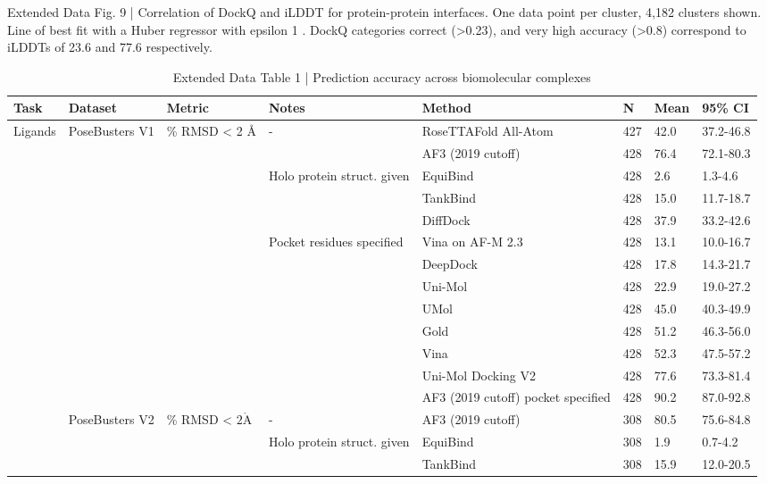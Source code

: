 \documentclass[10pt]{article}
\def\AA{\mathring{\mathrm{A}}}
\begin{document}
Extended Data Fig. 9 | Correlation of DockQ and iLDDT for protein-protein interfaces. One data point per cluster, 4,182 clusters shown. Line of best fit with a Huber regressor with epsilon 1 . DockQ categories correct (>0.23), and very high accuracy (>0.8) correspond to iLDDTs of 23.6 and 77.6 respectively.

\begin{table}[h]
\begin{center}
\captionsetup{labelformat=empty}
\caption{Extended Data Table 1 | Prediction accuracy across biomolecular complexes}
\begin{tabular}{|l|l|l|l|l|l|l|l|}
\hline
Task & Dataset & Metric & Notes & Method & N & Mean & 95\% CI \\
\hline
\multirow[t]{23}{*}{Ligands} & \multirow[t]{13}{*}{PoseBusters V1} & \multirow[t]{13}{*}{\% RMSD < 2 Å} & \multirow[t]{2}{*}{-} & RoseTTAFold All-Atom & 427 & 42.0 & 37.2-46.8 \\
\hline
 &  &  &  & AF3 (2019 cutoff) & 428 & 76.4 & 72.1-80.3 \\
\hline
 &  &  & \multirow[t]{3}{*}{Holo protein struct. given} & EquiBind & 428 & 2.6 & 1.3-4.6 \\
\hline
 &  &  &  & TankBind & 428 & 15.0 & 11.7-18.7 \\
\hline
 &  &  &  & DiffDock & 428 & 37.9 & 33.2-42.6 \\
\hline
 &  &  & \multirow[t]{8}{*}{Pocket residues specified} & Vina on AF-M 2.3 & 428 & 13.1 & 10.0-16.7 \\
\hline
 &  &  &  & DeepDock & 428 & 17.8 & 14.3-21.7 \\
\hline
 &  &  &  & Uni-Mol & 428 & 22.9 & 19.0-27.2 \\
\hline
 &  &  &  & UMol & 428 & 45.0 & 40.3-49.9 \\
\hline
 &  &  &  & Gold & 428 & 51.2 & 46.3-56.0 \\
\hline
 &  &  &  & Vina & 428 & 52.3 & 47.5-57.2 \\
\hline
 &  &  &  & Uni-Mol Docking V2 & 428 & 77.6 & 73.3-81.4 \\
\hline
 &  &  &  & AF3 (2019 cutoff) pocket specified & 428 & 90.2 & 87.0-92.8 \\
\hline
 & \multirow[t]{10}{*}{PoseBusters V2} & \multirow[t]{10}{*}{\% RMSD < $2 \AA$} & - & AF3 (2019 cutoff) & 308 & 80.5 & 75.6-84.8 \\
\hline
 &  &  & \multirow[t]{3}{*}{Holo protein struct. given} & EquiBind & 308 & 1.9 & 0.7-4.2 \\
\hline
 &  &  &  & TankBind & 308 & 15.9 & 12.0-20.5 \\

\end{tabular}
\end{center}
\end{table}
\end{document}
